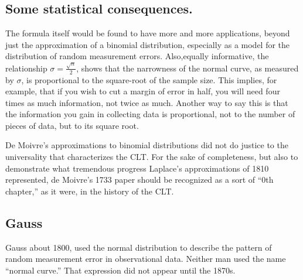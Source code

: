 \documentclass{article}
\begin{document}
\subsection{Some statistical consequences.}
The formula itself would be found to have more and more applications, beyond just the approximation of a binomial distribution, especially as a model for the distribution of random measurement errors. Also,equally informative, the relationship $ \sigma = \frac{\sqrt{n}}{2}$, shows that the narrowness of the normal curve, as measured by $\sigma$, is proportional to the square-root of the sample size. This implies, for example, that if you wish to cut a margin of error in half, you will need four times as much information, not twice as much. Another way to say this is that the information you gain in collecting data is proportional, not to the number of pieces of data, but to its square root.

De Moivre’s approximations to binomial distributions did not do justice to the universality that characterizes the CLT. For the sake of completeness, but also to demonstrate what tremendous progress Laplace’s approximations of 1810 represented, de Moivre’s 1733 paper should be recognized as a sort of “0th chapter,” as it were, in the history of the CLT.

\subsection{Gauss}
Gauss about 1800, used the normal distribution to describe the pattern of random measurement error in observational data. Neither man used the name “normal curve.” That expression did not appear until the 1870s.
\end{document}
